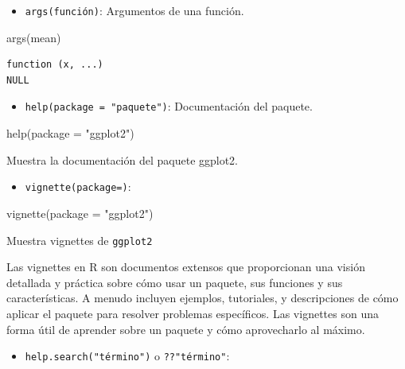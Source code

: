 \documentclass[
  letterpaper,
]{scrbook}
\newenvironment{Shaded}{\begin{snugshade}}{\end{snugshade}}
\newcommand{\AttributeTok}[1]{\textcolor[rgb]{0.40,0.45,0.13}{#1}}
\newcommand{\FunctionTok}[1]{\textcolor[rgb]{0.28,0.35,0.67}{#1}}
\newcommand{\NormalTok}[1]{\textcolor[rgb]{0.00,0.23,0.31}{#1}}
\newcommand{\StringTok}[1]{\textcolor[rgb]{0.13,0.47,0.30}{#1}}
\providecommand{\tightlist}{%
  \setlength{\itemsep}{0pt}\setlength{\parskip}{0pt}}\usepackage{longtable,booktabs,array}
\begin{document}
\begin{itemize}
\tightlist
\item
  \texttt{args(función)}: Argumentos de una función.
\end{itemize}

\begin{Shaded}
\begin{Highlighting}[]
\FunctionTok{args}\NormalTok{(mean)}
\end{Highlighting}
\end{Shaded}

\begin{verbatim}
function (x, ...) 
NULL
\end{verbatim}

\begin{itemize}
\tightlist
\item
  \texttt{help(package\ =\ "paquete")}: Documentación del paquete.
\end{itemize}

\begin{Shaded}
\begin{Highlighting}[]
\FunctionTok{help}\NormalTok{(}\AttributeTok{package =} \StringTok{"ggplot2"}\NormalTok{)}
\end{Highlighting}
\end{Shaded}

Muestra la documentación del paquete ggplot2.

\begin{itemize}
\tightlist
\item
  \texttt{vignette(package=)}:
\end{itemize}

\begin{Shaded}
\begin{Highlighting}[]
\FunctionTok{vignette}\NormalTok{(}\AttributeTok{package =} \StringTok{"ggplot2"}\NormalTok{)}
\end{Highlighting}
\end{Shaded}

Muestra vignettes de \texttt{ggplot2}

Las vignettes en R son documentos extensos que proporcionan una visión
detallada y práctica sobre cómo usar un paquete, sus funciones y sus
características. A menudo incluyen ejemplos, tutoriales, y descripciones
de cómo aplicar el paquete para resolver problemas específicos. Las
vignettes son una forma útil de aprender sobre un paquete y cómo
aprovecharlo al máximo.

\begin{itemize}
\tightlist
\item
  \texttt{help.search("término")} o \texttt{??"término"}:
\end{itemize}
\end{document}
